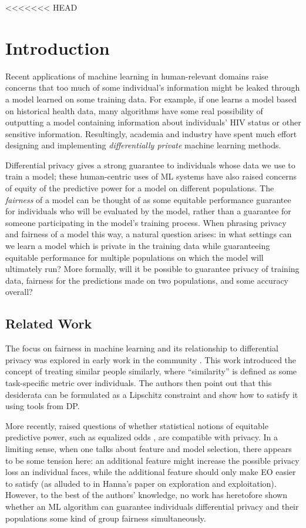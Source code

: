 <<<<<<< HEAD

\section{Introduction}
Recent applications of machine learning in human-relevant domains
raise concerns that too much of some individual's information might be
leaked through a model learned on some training data. For example, if
one learns a model based on historical health data, many algorithms
have some real possibility of outputting a model containing
information about individuals' HIV status or other sensitive
information.  Resultingly, academia and industry have spent much
effort designing and implementing \emph{differentially private}
machine learning methods.

Differential privacy gives a strong guarantee to individuals whose
data we use to train a model; these human-centric uses of ML systems
have also raised concerns of equity of the predictive power for a
model on different populations. The \emph{fairness} of a model can be
thought of as some equitable performance guarantee for individuals who
will be evaluated by the model, rather than a guarantee for someone
participating in the model's training process. When phrasing privacy
and fairness of a model this way, a natural question arises: in what
settings can we learn a model which is private in the training data
while guaranteeing equitable performance for multiple populations on
which the model will ultimately run? More formally, will it be
possible to guarantee privacy of training data, fairness for the
predictions made on two populations, and some accuracy overall?


\subsection{Related Work}

The focus on fairness in machine learning and its relationship to
differential privacy was explored in early work in the community \citep{dworkfta}. This work introduced the concept of
treating similar people similarly, where ``similarity'' is defined as
some task-specific metric over individuals.  The authors then point
out that this desiderata can be formulated as a Lipschitz constraint
and show how to satisfy it using tools from DP.

More recently, \citet{ekstrandprivfair} raised questions of whether
statistical notions of equitable predictive power, such as equalized
odds \cite{hardteqop}, are compatible with privacy. In a limiting sense,
when one talks about feature and model selection, there appears to be
some tension here: an additional feature might increase the possible
privacy loss an individual faces, while the additional feature should
only make EO easier to satisfy (as alluded to in Hanna's paper on
exploration and exploitation). However, to the best of the authors'
knowledge, no work has heretofore shown whether an ML algorithm can
guarantee individuals differential privacy and their populations some
kind of group fairness simultaneously.


